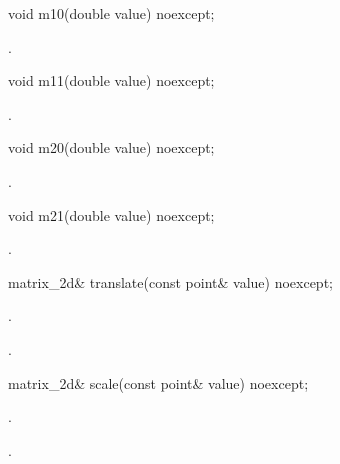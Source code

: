 \begin{itemdecl}
	void m10(double value) noexcept;
\end{itemdecl}
\begin{itemdescr}
	\pnum
	\postconditions
	.
	
\end{itemdescr}

\begin{itemdecl}
	void m11(double value) noexcept;
\end{itemdecl}
\begin{itemdescr}
	\pnum
	\postconditions
	.
	
\end{itemdescr}

\begin{itemdecl}
	void m20(double value) noexcept;
\end{itemdecl}
\begin{itemdescr}
	\pnum
	\postconditions
	.
	
\end{itemdescr}

\begin{itemdecl}
	void m21(double value) noexcept;
\end{itemdecl}
\begin{itemdescr}
	\pnum
	\postconditions
	.
	
\end{itemdescr}

\begin{itemdecl}
matrix_2d& translate(const point& value) noexcept;
\end{itemdecl}
\begin{itemdescr}
	\pnum
	\effects
	.
	
	\pnum
	\returns
	.
\end{itemdescr}

\begin{itemdecl}
matrix_2d& scale(const point& value) noexcept;
\end{itemdecl}
\begin{itemdescr}
	\pnum
	\effects
	.
	
	\pnum
	\returns
	.
\end{itemdescr}

